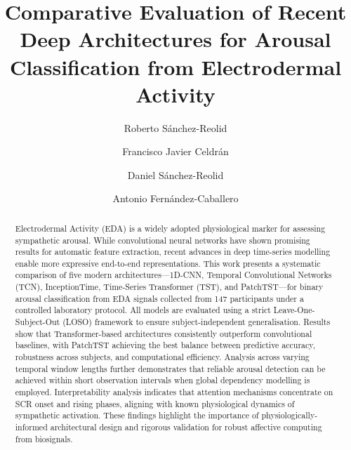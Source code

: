 \documentclass[runningheads]{llncs}
\begin{document}
%
\title{Comparative Evaluation of Recent Deep Architectures for Arousal Classification from Electrodermal Activity}

%
%
\author{
Roberto Sánchez-Reolid \and
Francisco Javier Celdrán \and
Daniel Sánchez-Reolid \and
Antonio Fernández-Caballero
}
%
\maketitle              %
%
\begin{abstract}
Electrodermal Activity (EDA) is a widely adopted physiological marker for assessing sympathetic arousal. While convolutional neural networks have shown promising results for automatic feature extraction, recent advances in deep time-series modelling enable more expressive end-to-end representations. This work presents a systematic comparison of five modern architectures—1D-CNN, Temporal Convolutional Networks (TCN), InceptionTime, Time-Series Transformer (TST), and PatchTST—for binary arousal classification from EDA signals collected from 147 participants under a controlled laboratory protocol. All models are evaluated using a strict Leave-One-Subject-Out (LOSO) framework to ensure subject-independent generalisation. Results show that Transformer-based architectures consistently outperform convolutional baselines, with PatchTST achieving the best balance between predictive accuracy, robustness across subjects, and computational efficiency. Analysis across varying temporal window lengths further demonstrates that reliable arousal detection can be achieved within short observation intervals when global dependency modelling is employed. Interpretability analysis indicates that attention mechanisms concentrate on SCR onset and rising phases, aligning with known physiological dynamics of sympathetic activation. These findings highlight the importance of physiologically-informed architectural design and rigorous validation for robust affective computing from biosignals.
\end{abstract}
%
%
%
\end{document}
